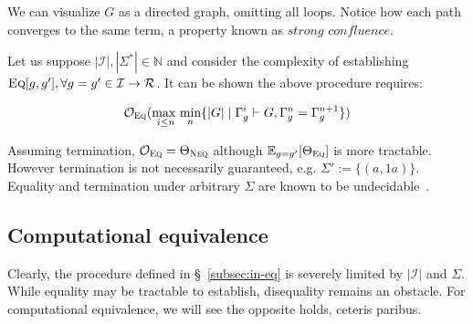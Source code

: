 \documentclass[11pt]{article}
\begin{document}
    \noindent We can visualize $G$ as a directed graph, omitting all loops. Notice how each path converges to the same term, a property known as $\textit{strong confluence}$.

    \hspace{12pt}

    \noindent Let us suppose $|\mathcal{I}|, |\Sigma^*| \in \mathbb{N}$ and consider the complexity of establishing $\textsc{Eq}[g, g'], \forall g = g' \in \mathcal{I} \rightarrow \mathcal{R}$. It can be shown the above procedure requires:

    $$\mathcal{O}_{\textsc{Eq}}(\underset{i \leq n}{\text{max }}\underset{n}{\text{min}}\{|G| \mid \Gamma^i_g \vdash G, \Gamma_g^n = \Gamma_g^{n+1}\})$$ %

    \noindent Assuming termination, $\mathcal{O}_{\textsc{Eq}} = \Theta_{\textsc{Neq}}$ although $\mathbb{E}_{g=g'}[\Theta_\textsc{Eq}]$ is more tractable. However termination is not necessarily guaranteed, e.g. $\Sigma' := \{(a, 1a)\}$. Equality and termination under arbitrary $\Sigma$ are known to be undecidable~\citep{baader1999term}.

    \subsection{Computational equivalence}\label{subsec:comp-eq}

    Clearly, the procedure defined in \S~\ref{subsec:in-eq} is severely limited by $|\mathcal{I}|$ and $\Sigma$. While equality may be tractable to establish, disequality remains an obstacle. For computational equivalence, we will see the opposite holds, ceteris paribus.
\end{document}
